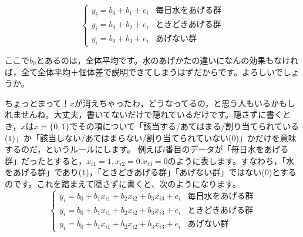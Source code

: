 \documentclass{ltjbook}
\begin{document}
\[
\label{eq13_01}
  \begin{cases}
    y_i = b_0 + b_1 + e_i & \mbox{毎日水をあげる群}\\
    y_i = b_0 + b_2 + e_i & \mbox{ときどきあげる群}\\
    y_i = b_0 + b_3 + e_i & \mbox{あげない群}
  \end{cases}
\]

ここで$b_0$とあるのは，全体平均です。水のあげかたの違いになんの効果もなければ，全て全体平均＋個体差で説明できてしまうはずだからです。よろしいでしょうか。

ちょっとまって！$x$が消えちゃったわ，どうなってるの，と思う人もいるかもしれませんね。大丈夫，書いてないだけで隠れているだけです。隠さずに書くとき，$x$は$x=\{0,1\}$でその項について「該当する/あてはまる/割り当てられている($1$)」か「該当しない/あてはまらない/割り当てられていない($0$)」かだけを意味するのだ，というルールにします。
例えば$i$番目のデータが「毎日水をあげる群」だったとすると，$x_{i1}=1,x_{i2}=0.x_{i3}=0$のように表します。すなわち，「水をあげる群」であり($1$)，「ときどきあげる群」「あげない群」ではない($0$)とするのです。これを踏まえて隠さずに書くと、次のようになります。
\[
\label{eq13_01b}
  \begin{cases}
    y_i = b_0 + b_1x_{i1} + b_2x_{i2} + b_3x_{i3} + e_i & \mbox{毎日水をあげる群}\\
    y_i = b_0 + b_1x_{i1} + b_2x_{i2} + b_3x_{i3} + e_i & \mbox{ときどきあげる群}\\
    y_i = b_0 + b_1x_{i1} + b_2x_{i2} + b_3x_{i3} + e_i & \mbox{あげない群}
  \end{cases}
\]
\end{document}
